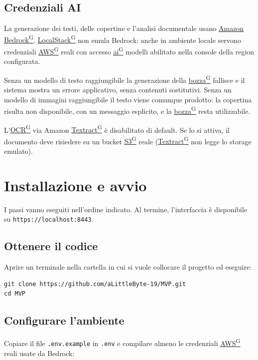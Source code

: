 \documentclass[a4paper,12pt]{article}
\providecommand{\glslink}[2]{\href{https://alittlebyte-19.github.io/Documentazione/glossario.html\#gls-#1}{\underline{#2}\textsuperscript{\scriptsize G}}}
\begin{document}
\subsection{Credenziali AI}

La generazione dei testi, delle copertine e l'analisi documentale usano \glslink{amazon-bedrock}{Amazon Bedrock}. \glslink{localstack}{LocalStack} non emula Bedrock: anche in ambiente locale servono credenziali \glslink{aws}{AWS} reali con accesso \glslink{intelligenza-artificiale-ai}{ai} modelli abilitato nella console della region configurata.

Senza un modello di testo raggiungibile la generazione della \glslink{bozza-draft}{bozza} fallisce e il sistema mostra un errore applicativo, senza contenuti sostitutivi. Senza un modello di immagini raggiungibile il testo viene comunque prodotto: la copertina risulta non disponibile, con un messaggio esplicito, e la \glslink{bozza-draft}{bozza} resta utilizzabile.

L'\glslink{ocr-riconoscimento-ottico-dei-caratteri}{OCR} via Amazon \glslink{textract}{Textract} è disabilitato di default. Se lo si attiva, il documento deve risiedere su un bucket \glslink{s3-simple-storage-service}{S3} reale (\glslink{textract}{Textract} non legge lo storage emulato).

\section{Installazione e avvio}

I passi vanno eseguiti nell'ordine indicato. Al termine, l'interfaccia è disponibile su \texttt{https://localhost:8443}.

\subsection{Ottenere il codice}

Aprire un terminale nella cartella in cui si vuole collocare il progetto ed eseguire:

\begin{verbatim}
git clone https://github.com/aLittleByte-19/MVP.git
cd MVP
\end{verbatim}

\subsection{Configurare l'ambiente}

Copiare il file \texttt{.env.example} in \texttt{.env} e compilare almeno le credenziali \glslink{aws}{AWS} reali usate da Bedrock:
\end{document}
